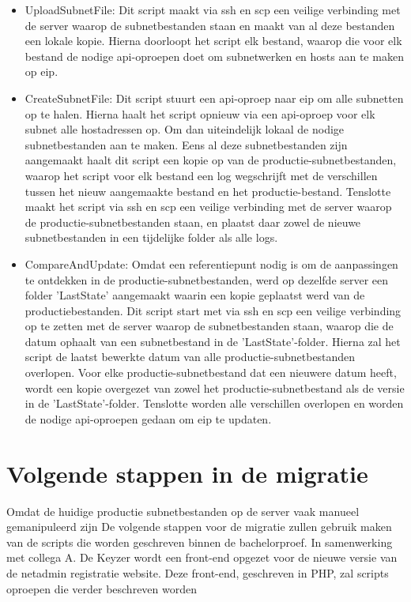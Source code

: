 \begin{itemize}
    \item UploadSubnetFile: Dit script maakt via \acrshort{ssh} en \acrshort{scp} een veilige verbinding met de server waarop de subnetbestanden staan en maakt van al deze bestanden een lokale kopie. Hierna doorloopt het script elk bestand, waarop die voor elk bestand de nodige \acrshort{api}-oproepen doet om subnetwerken en hosts aan te maken op \acrshort{eip}.
    \item CreateSubnetFile: Dit script stuurt een \acrshort{api}-oproep naar \acrshort{eip} om alle subnetten op te halen. Hierna haalt het script opnieuw via een \acrshort{api}-oproep voor elk subnet alle hostadressen op. Om dan uiteindelijk lokaal de nodige subnetbestanden aan te maken. Eens al deze subnetbestanden zijn aangemaakt haalt dit script een kopie op van de productie-subnetbestanden, waarop het script voor elk bestand een log wegschrijft met de verschillen tussen het nieuw aangemaakte bestand en het productie-bestand. Tenslotte maakt het script via \acrshort{ssh} en \acrshort{scp} een veilige verbinding met de server waarop de productie-subnetbestanden staan, en plaatst daar zowel de nieuwe subnetbestanden in een tijdelijke folder als alle logs.
    \item CompareAndUpdate: Omdat een referentiepunt nodig is om de aanpassingen te ontdekken in de productie-subnetbestanden, werd op dezelfde server een folder 'LastState' aangemaakt waarin een kopie geplaatst werd van de productiebestanden. Dit script start met via \acrshort{ssh} en \acrshort{scp} een veilige verbinding op te zetten met de server waarop de subnetbestanden staan, waarop die de datum ophaalt van een subnetbestand in de 'LastState'-folder. Hierna zal het script de laatst bewerkte datum van alle productie-subnetbestanden overlopen. Voor elke productie-subnetbestand dat een nieuwere datum heeft, wordt een kopie overgezet van zowel het productie-subnetbestand als de versie in de 'LastState'-folder. Tenslotte worden alle verschillen overlopen en worden de nodige \acrshort{api}-oproepen gedaan om \acrshort{eip} te updaten.
\end{itemize}


\section{Volgende stappen in de migratie}
Omdat de huidige productie subnetbestanden op de server vaak manueel gemanipuleerd zijn 
De volgende stappen voor de migratie zullen gebruik maken van de scripts die worden geschreven binnen de bachelorproef.
In samenwerking met collega A. De Keyzer wordt een front-end opgezet voor de nieuwe versie van de netadmin registratie website. Deze front-end, geschreven in PHP, zal scripts oproepen die verder beschreven worden



